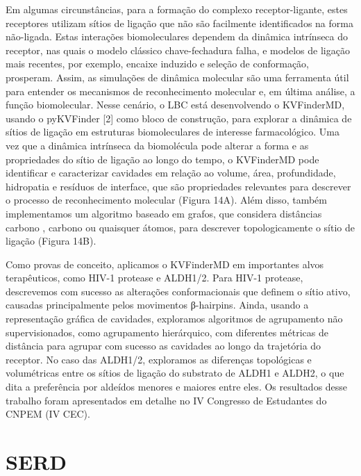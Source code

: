 \documentclass[Portugues]{phdquali}
\begin{document}
Em algumas circunstâncias, para a formação do complexo receptor-ligante, estes receptores utilizam sítios de ligação que não são facilmente identificados na forma não-ligada. Estas interações biomoleculares dependem da dinâmica intrínseca do receptor, nas quais o modelo clássico chave-fechadura falha, e modelos de ligação mais recentes, por exemplo, encaixe induzido e seleção de conformação, prosperam. Assim, as simulações de dinâmica molecular são uma ferramenta útil para entender os mecanismos de reconhecimento molecular e, em última análise, a função biomolecular. Nesse cenário, o LBC está desenvolvendo o KVFinderMD, usando o pyKVFinder [2] como bloco de construção, para explorar a dinâmica de sítios de ligação em estruturas biomoleculares de interesse farmacológico. Uma vez que a dinâmica intrínseca da biomolécula pode alterar a forma e as propriedades do sítio de ligação ao longo do tempo, o KVFinderMD pode identificar e caracterizar cavidades em relação ao volume, área, profundidade, hidropatia e resíduos de interface, que são propriedades relevantes para descrever o processo de reconhecimento molecular (Figura 14A). Além disso, também implementamos um algoritmo baseado em grafos, que considera distâncias carbono \textalpha, carbono \textbeta\space ou quaisquer átomos, para descrever topologicamente o sítio de ligação (Figura 14B).

Como provas de conceito, aplicamos o KVFinderMD em importantes alvos terapêuticos, como HIV-1 protease e ALDH1/2. Para HIV-1 protease, descrevemos com sucesso as alterações conformacionais que definem o sítio ativo, causadas principalmente pelos movimentos β-hairpins. Ainda, usando a representação gráfica de cavidades, exploramos algoritmos de agrupamento não supervisionados, como agrupamento hierárquico, com diferentes métricas de distância para agrupar com sucesso as cavidades ao longo da trajetória do receptor. No caso das ALDH1/2, exploramos as diferenças topológicas e volumétricas entre os sítios de ligação do substrato de ALDH1 e ALDH2, o que dita a preferência por aldeídos menores e maiores entre eles. Os resultados desse trabalho foram apresentados em detalhe no IV Congresso de Estudantes do CNPEM (IV CEC). 

\section{SERD}
\end{document}
